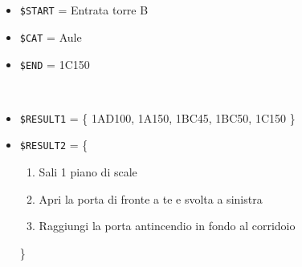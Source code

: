 \documentclass[../../Sperimentazione.tex]{subfiles}
\begin{document}
			\paragraph*{}
			\label{Prova1A.2}	
			\begin{tcolorbox}[fonttitle=\bfseries, 
								adjusted title={\Large Prova 1A.2}, 
								breakable, 
								sharp corners=south,
								colback=white, 
								colframe=white!60!black]
								
				\begin{description}[leftmargin=0.7cm,labelwidth=!]
				
					\item[Input] \ \par 
        				\begin{itemize}
        					\item \verb|$START| = Entrata torre B
        					\item \verb|$CAT| = Aule
							\item \verb|$END| = 1C150
        				\end{itemize}
        				
        			\tcbline 
        				
        			\item[Output atteso] \ \par
        				\begin{itemize}
        				
        					\item \verb|$RESULT1| = \{
        						1AD100, 1A150, 1BC45, 1BC50, 1C150
        					\}
        				
        					\item \verb|$RESULT2| = \{
        					\begin{enumerate}
        						\item Sali 1 piano di scale
								\item Apri la porta di fronte a te e svolta a sinistra
								\item Raggiungi la porta antincendio in fondo al corridoio
								
        					\end{enumerate}
        					\}
        					
        					
        					
        				\end{itemize}

					\tcbline        				
        				
        			\item[Output riscontrato] \ \par
        				\begin{description}
        				

\end{description}
\end{description}
\end{tcolorbox}
\end{document}
